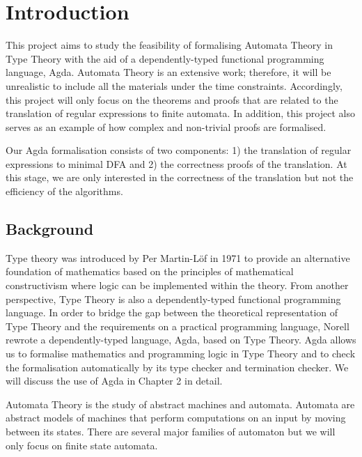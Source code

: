 \chapter{Introduction}
\par This project aims to study the feasibility of formalising
Automata Theory \cite{aho1972} in Type Theory
\cite{martin1984} with the aid of a dependently-typed functional
programming language, Agda. Automata Theory is an extensive work;
therefore, it will be unrealistic to
include all the materials under the time constraints. Accordingly,
this project will only focus on the theorems and
proofs that are related to the translation of regular expressions
to finite automata. In addition, this project also serves as an
example of how complex and non-trivial proofs are formalised. 

\par Our Agda formalisation consists of two components: 1) the
translation of regular expressions to minimal DFA and 2)
the correctness proofs of the translation. At this stage, we are only
interested in the correctness of the translation but not the
efficiency of the algorithms. 


\section{Background}
\par Type theory was introduced by Per Martin-L{\"o}f in
1971 to provide an alternative foundation of mathematics based on the
principles of mathematical constructivism where logic can be
implemented within the theory. From another perspective, Type Theory is also a
dependently-typed functional programming language. In order to bridge the gap between
the theoretical representation of Type Theory and the requirements on
a practical programming language, Norell \cite{norell2007} rewrote a
dependently-typed language, Agda, based on Type Theory. Agda allows us
to formalise mathematics and programming logic in Type Theory and to 
check the formalisation automatically by its type checker and termination
checker. We will discuss the use of Agda in Chapter 2 in detail. 

\par Automata Theory is the study of abstract machines and
automata. Automata are abstract models of machines that perform
computations on an input by moving between its states. There
are several major families of automaton but we will
only focus on finite state automata. 


